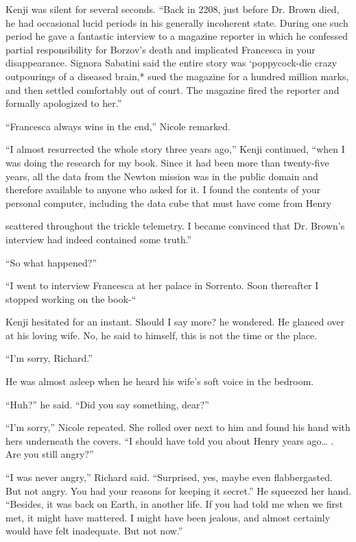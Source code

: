 \documentclass[]{article}
\begin{document}
{Kenji was silent for several seconds. “Back in 2208, just before Dr. Brown died, he had occasional lucid periods in his generally incoherent state. During one such period he gave a fantastic interview to a magazine reporter in which he confessed partial responsibility for Borzov’s death and implicated Francesca in your disappearance. Signora Sabatini said the entire story was ‘poppycock-die crazy outpourings of a diseased brain,* sued the magazine for a hundred million marks, and then settled comfortably out of court. The magazine fired the reporter and formally apologized to her.”

“Francesca always wins in the end,” Nicole remarked.

“I almost resurrected the whole story three years ago,” Kenji continued, “when I was doing the research for my book. Since it had been more than twenty-five years, all the data from the Newton mission was in the public domain and therefore available to anyone who asked for it. I found the contents of your personal computer, including the data cube that must have come from Henry

scattered throughout the trickle telemetry. I became convinced that Dr. Brown’s interview had indeed contained some truth.”

“So what happened?”

“I went to interview Francesca at her palace in Sorrento. Soon thereafter I stopped working on the book-“

Kenji hesitated for an instant. Should I say more? he wondered. He glanced over at his loving wife. No, he said to himself, this is not the time or the place.

“I’m sorry, Richard.”

He was almost asleep when he heard his wife’s soft voice in the bedroom.

“Huh?” he said. “Did you say something, dear?”

“I’m sorry,” Nicole repeated. She rolled over next to him and found his hand with hers underneath the covers. “I should have told you about Henry years ago… . Are you still angry?”

“I was never angry,” Richard said. “Surprised, yes, maybe even flabbergasted. But not angry. You had your reasons for keeping it secret.” He squeezed her hand. “Besides, it was back on Earth, in another life. If you had told me when we first met, it might have mattered. I might have been jealous, and almost certainly would have felt inadequate. But not now.”

}
\end{document}
